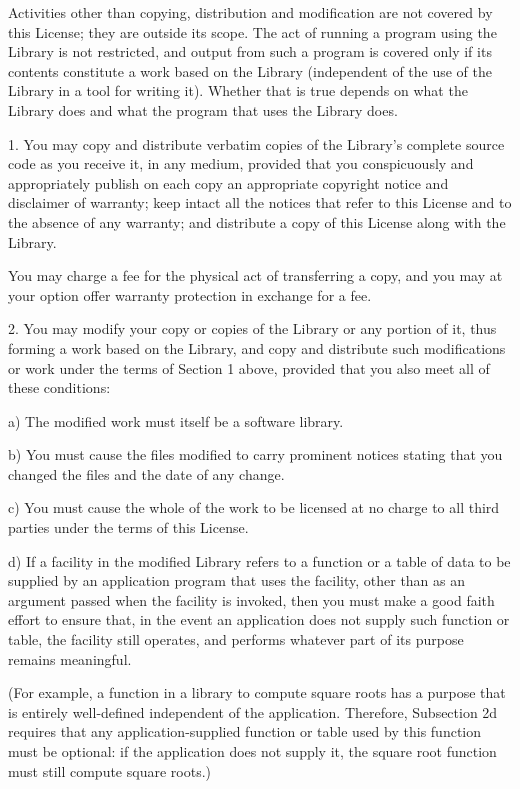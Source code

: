 \documentclass[a4paper,twoside]{tceusermanual}
\begin{document}
Activities other than copying, distribution and modification are
not covered by this License; they are outside its scope.  The
act of running a program using the Library is not restricted,
and output from such a program is covered only if its contents
constitute a work based on the Library (independent of the use
of the Library in a tool for writing it).  Whether that is true
depends on what the Library does and what the program that uses
the Library does.
  
1. You may copy and distribute verbatim copies of the Library's
complete source code as you receive it, in any medium, provided
that you conspicuously and appropriately publish on each copy an
appropriate copyright notice and disclaimer of warranty; keep
intact all the notices that refer to this License and to the
absence of any warranty; and distribute a copy of this License
along with the Library.

You may charge a fee for the physical act of transferring a
copy, and you may at your option offer warranty protection in
exchange for a fee.
 
2. You may modify your copy or copies of the Library or any
portion of it, thus forming a work based on the Library, and
copy and distribute such modifications or work under the terms
of Section 1 above, provided that you also meet all of these
conditions:

    a) The modified work must itself be a software library.

    b) You must cause the files modified to carry prominent notices
    stating that you changed the files and the date of any change.

    c) You must cause the whole of the work to be licensed at no
    charge to all third parties under the terms of this License.

    d) If a facility in the modified Library refers to a function or a
    table of data to be supplied by an application program that uses
    the facility, other than as an argument passed when the facility
    is invoked, then you must make a good faith effort to ensure that,
    in the event an application does not supply such function or
    table, the facility still operates, and performs whatever part of
    its purpose remains meaningful.

    (For example, a function in a library to compute square roots has
    a purpose that is entirely well-defined independent of the
    application.  Therefore, Subsection 2d requires that any
    application-supplied function or table used by this function must
    be optional: if the application does not supply it, the square
    root function must still compute square roots.)
\end{document}
